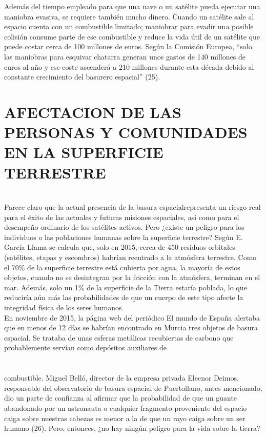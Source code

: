 \documentclass[12pt,letterpaper]{article}
\begin{document}
\pagestyle{fancy}
        \fancyhf{}
        \rhead{}
\begin{multicols}{2}
\noindent Además del tiempo empleado para que una nave o
un satélite pueda ejecutar una maniobra evasiva, se
requiere también mucho dinero. Cuando un satélite
sale al espacio cuenta con un combustible limitado;
maniobrar para evadir una posible colisión consume
parte de ese combustible y reduce la vida útil de un satélite que puede costar cerca de 100 millones de euros.
Según la Comisión Europea, “solo las maniobras para
esquivar chatarra generan unos gastos de 140 millones
de euros al año y ese coste ascenderá a 210 millones
durante esta década debido al constante crecimiento
del basurero espacial” (25).
\section*{\noindent \small {AFECTACION DE LAS PERSONAS Y COMUNIDADES EN LA SUPERFICIE TERRESTRE}}
\\

\noindent Parece claro que la actual presencia de la basura espacialrepresenta un riesgo real para el éxito de las actuales y
futuras misiones espaciales, así como para el desempeño
ordinario de los satélites activos. Pero ¿existe un peligro
para los individuos o las poblaciones humanas sobre la
superficie terrestre? Según E. García Llama se calcula
que, solo en 2015, cerca de 450 residuos orbitales
(satélites, etapas y escombros) habrían reentrado a
la atmósfera terrestre. Como el 70\% de la superficie
terrestre está cubierta por agua, la mayoría de estos
objetos, cuando no se desintegran por la fricción con la
atmósfera, terminan en el mar. Además, solo un 1\% de
la superficie de la Tierra estaría poblada, lo que reduciría
aún más las probabilidades de que un cuerpo de este
tipo afecte la integridad física de los seres humanos.
\\

\noindent En noviembre de 2015, la página web del periódico El
mundo de España alertaba que en menos de 12 días se
habrían encontrado en Murcia tres objetos de basura
espacial. Se trataba de unas esferas metálicas recubiertas de carbono que probablemente servían como depósitos auxiliares  de  
\\
\\
\\
combustible.  Miguel  Belló,  director  de  la  empresa  privada Elecnor  Deimos,  responsable  del  observatorio  de  basura  espacial  de  Puertollano,  antes  mencionado, dio un parte de confianza al afirmar que la probabilidad de que un guante abandonado por un astronauta o cualquier fragmento proveniente del espacio caiga sobre nuestras cabezas es menor a la de que un rayo caiga sobre un ser humano (26). Pero, entonces, ¿no hay ningún peligro para la vida sobre la tierra?
\\


\end{multicols}
\end{document}
